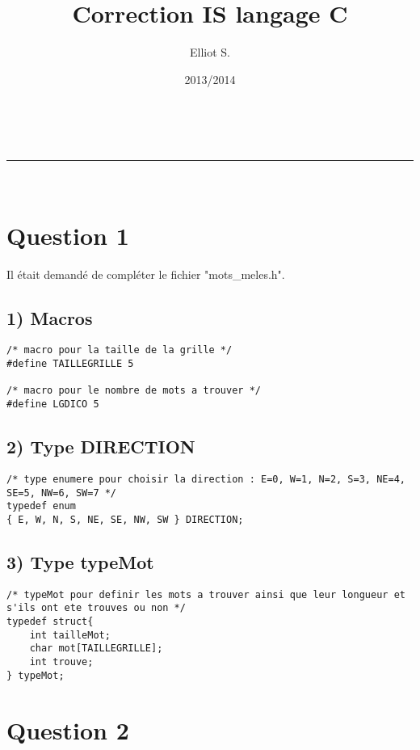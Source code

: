 \documentclass[a4paper,11pt]{article}
\makeatletter
\newcommand{\linia}{\rule{\linewidth}{0.5pt}}
\renewcommand{\maketitle}{
\begin{center}
\vspace{2ex}
{\huge \textsc{\@title}}
\vspace{1ex}
\\
\linia\\
\@author \hfill \@date
\vspace{4ex}
\end{center}
}
\makeatother
\begin{document}
\title{Correction IS langage C}

\author{Elliot S.}

\date{2013/2014}

\maketitle

\section*{Question 1}

Il était demandé de compléter le fichier "mots\_meles.h".

\subsection*{1) Macros}

\begin{lstlisting}[caption=Les macros TAILLEGRILLE et LGDICO]
/* macro pour la taille de la grille */
#define TAILLEGRILLE 5

/* macro pour le nombre de mots a trouver */
#define LGDICO 5
\end{lstlisting}

\subsection*{2) Type DIRECTION}

\begin{lstlisting}[caption=Le type DIRECTION]
/* type enumere pour choisir la direction : E=0, W=1, N=2, S=3, NE=4, SE=5, NW=6, SW=7 */
typedef enum 
{ E, W, N, S, NE, SE, NW, SW } DIRECTION;
\end{lstlisting}

\subsection*{3) Type typeMot}

\begin{lstlisting}[caption=Le type typeMot]
/* typeMot pour definir les mots a trouver ainsi que leur longueur et s'ils ont ete trouves ou non */
typedef struct{ 
	int tailleMot;
	char mot[TAILLEGRILLE];
	int trouve; 
} typeMot;
\end{lstlisting}

\newpage{}

\section*{Question 2}
\end{document}
